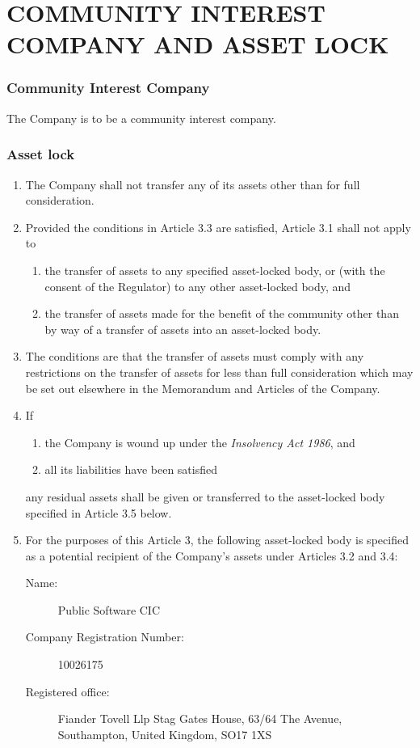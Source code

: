 \documentclass[a4paper,12pt]{article}
\renewcommand{\labelenumii}{(\alph{enumii})}
\begin{document}
\part*{COMMUNITY INTEREST COMPANY AND ASSET LOCK}

\section{Community Interest Company}

{\color{red}The Company is to be a community interest company.} %

\section{Asset lock}

\begin{enumerate}
  \color{red}
  \item The Company shall not transfer any of its assets other than for full consideration. %
  \item Provided the conditions in Article 3.3 are satisfied, Article 3.1 shall not apply to %
  \begin{enumerate}
    \renewcommand{\labelenumii}{(\alph{enumii})}
    \item the transfer of assets to any specified asset-locked body, or (with the consent of the Regulator) to any other asset-locked body, and %
    \item the transfer of assets made for the benefit of the community other than by way of a transfer of assets into an asset-locked body. %
  \end{enumerate}
  \item The conditions are that the transfer of assets must comply with any restrictions on the transfer of assets for less than full consideration which may be set out elsewhere in the Memorandum and Articles of the Company.\color{black} %
  \item If
  \begin{enumerate}
    \item the Company is wound up under the \textit{Insolvency Act 1986}, and
    \item all its liabilities have been satisfied
  \end{enumerate}
  any residual assets shall be given or transferred to the asset-locked body specified in Article 3.5 below.
  \item For the purposes of this Article 3, the following asset-locked body is specified as a potential recipient of the Company's assets under Articles 3.2 and 3.4:
  \begin{description}
    \item[Name:] Public Software CIC
    \item[Company Registration Number:] 10026175
    \item[Registered office:] Fiander Tovell Llp Stag Gates House, 63/64 The Avenue, Southampton, United Kingdom, SO17 1XS
  \end{description}
\end{enumerate}
\end{document}
